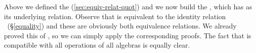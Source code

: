 \ccpad
Above we defined the   (\ref{sec:equiv-relat-quot}) and we now build the , which has  as its underlying relation. Observe that  is equivalent to the identity relation ~(\S\ref{equality}) and these are obviously both equivalence relations. We already proved this of , so we can simply apply the corresponding proofs. The fact that  is compatible with all operations of all algebras is equally clear.
\ccpad
\begin{code}%
\>[0]\AgdaSpace{}%
\AgdaSymbol{:}\AgdaSpace{}%
\AgdaSymbol{\{}\AgdaSpace{}%
\AgdaSymbol{:}\AgdaSpace{}%
\AgdaSpace{}%
\AgdaSymbol{\}}\AgdaSpace{}%
%
\>[31]\AgdaSpace{}%
\AgdaSymbol{\{}\AgdaSpace{}%
\AgdaSymbol{=}\AgdaSpace{}%
\AgdaSymbol{\}}\AgdaSpace{}%
\<%
\\
\>[0]\AgdaSpace{}%
\AgdaSymbol{=}\AgdaSpace{}%
\AgdaSpace{}%
\AgdaSymbol{\{}\AgdaSpace{}%
\AgdaSymbol{=}\AgdaSpace{}%
\AgdaSymbol{;}\AgdaSpace{}%
\AgdaSpace{}%
\AgdaSymbol{=}\AgdaSpace{}%
\AgdaSymbol{;}\AgdaSpace{}%
\AgdaSpace{}%
\AgdaSymbol{=}\AgdaSpace{}%
\AgdaSymbol{\}}\<%
\end{code}
\scpad

